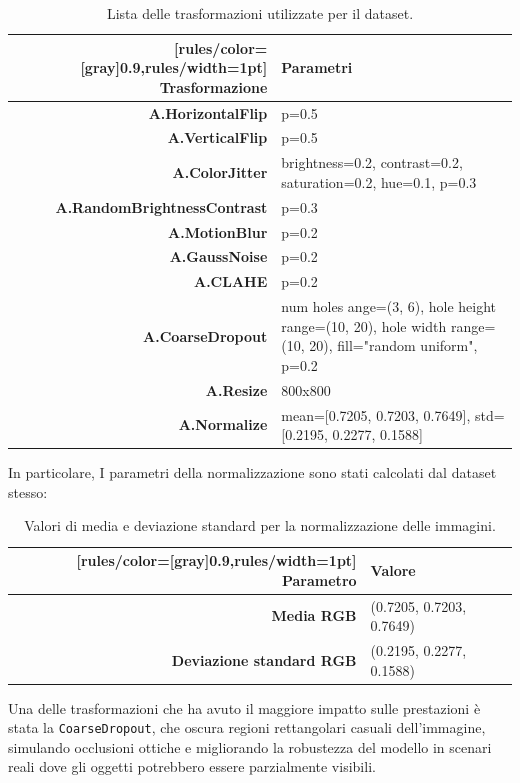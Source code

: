 \documentclass[minted, draw]{../tex/hebdomon}
\begin{document}
%
\begin{table}[H]
	\begin{NiceTabular}{rX}[rules/color=[gray]{0.9},rules/width=1pt]
		\CodeBefore
		\Body
		\toprule
		\textbf{Trasformazione}      & \textbf{Parametri}                                \\
		\midrule
		\textbf{A.HorizontalFlip} & p=0.5          \\
		\textbf{A.VerticalFlip}   & p=0.5        \\
		\textbf{A.ColorJitter} & brightness=0.2, contrast=0.2, saturation=0.2, hue=0.1, p=0.3\\
		\textbf{A.RandomBrightnessContrast} & p=0.3\\
		\textbf{A.MotionBlur} & p=0.2\\
		\textbf{A.GaussNoise} & p=0.2\\
		\textbf{A.CLAHE} & p=0.2 \\
		\textbf{A.CoarseDropout} & num holes ange=(3, 6), hole height range=(10, 20), hole width range=(10, 20), fill="random uniform", p=0.2 \\
		\textbf{A.Resize} & 800x800 \\
		\textbf{A.Normalize} & mean=[0.7205, 0.7203, 0.7649], std=[0.2195, 0.2277, 0.1588] \\
		\bottomrule
	\end{NiceTabular}
	\caption{Lista delle trasformazioni utilizzate per il dataset.}
\end{table}
%

In particolare, I parametri della normalizzazione sono stati calcolati dal dataset stesso:
\begin{table}[!ht]
	\begin{NiceTabular}{rX}[rules/color=[gray]{0.9},rules/width=1pt]
		\CodeBefore
		\Body
		\toprule
		\textbf{Parametro}      & \textbf{Valore}                                \\
		\midrule
		\textbf{Media RGB} & (0.7205, 0.7203, 0.7649) \\
		\textbf{Deviazione standard RGB} & (0.2195, 0.2277, 0.1588) \\
		\bottomrule
	\end{NiceTabular}
	\caption{Valori di media e deviazione standard per la normalizzazione delle immagini.}
\end{table}



Una delle trasformazioni che ha avuto il maggiore impatto sulle prestazioni è stata la \texttt{CoarseDropout}, che oscura regioni rettangolari casuali dell’immagine, simulando occlusioni ottiche e migliorando la robustezza del modello in scenari reali dove gli oggetti potrebbero essere parzialmente visibili.
\end{document}

